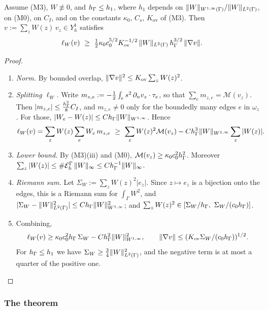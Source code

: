 \begin{lemma}\label{lb:assemble}
Assume (M3), $W\not\equiv0$, and $h_\Gamma\le h_1$, where $h_1$ depends on $\lVert W\rVert_{W^{1,\infty}(\Gamma)}/\lVert W\rVert_{L^2(\Gamma)}$, on (M0), on $C_I$, and on the constants $\kappa_0$, $C_s$, $K_{\mathrm{ov}}$ of (M3). Then $v:=\sum_zW(z)\,v_z\in Y_h^1$ satisfies
\[
\ell_W(v)\ \ge\ \tfrac12\kappa_0c_0^{5/2}K_{\mathrm{ov}}^{-1/2}\,\norm{W}_{L^2(\Gamma)}\,\hG^{3/2}\,\norm{\nabla v}.
\]
\end{lemma}

\begin{proof}
\begin{enumerate}
\item \emph{Norm.} By bounded overlap, $\lVert \nabla v\rVert^2\le K_{\mathrm{ov}}\sum_zW(z)^2$.
\item \emph{Splitting $\ell_W$.} Write $m_{z,e}:=-\frac12\int_es^2\,\partial_n v_z\cdot\tau_e$, so that $\sum_em_{z,e}=\mathcal M(v_z)$. Then $|m_{z,e}|\le\frac{h_\Gamma^2}{8}C_I$, and $m_{z,e}\ne0$ only for the boundedly many edges $e$ in $\omega_z$. For those, $|W_e-W(z)|\le Ch_\Gamma\lVert W\rVert_{W^{1,\infty}}$. Hence
\[
\ell_W(v)=\sum_zW(z)\sum_eW_e\,m_{z,e}\ \ge\ \sum_zW(z)^2\mathcal M(v_z)-C\hG^3\norm{W}_{W^{1,\infty}}\sum_z|W(z)| .
\]
\item \emph{Lower bound.} By (M3)(iii) and (M0), $\mathcal M(v_z)\ge\kappa_0c_0^2h_\Gamma^2$. Moreover $\sum_z|W(z)|\le\#\mathcal E_h^\Gamma\,\lVert W\rVert_\infty\le Ch_\Gamma^{-1}\lVert W\rVert_\infty$.
\item \emph{Riemann sum.} Let $\Sigma_W:=\sum_zW(z)^2|e_z|$. Since $z\mapsto e_z$ is a bijection onto the edges, this is a Riemann sum for $\int_\Gamma W^2$, and $|\Sigma_W-\lVert W\rVert^2_{L^2(\Gamma)}|\le Ch_\Gamma\lVert W\rVert^2_{W^{1,\infty}}$; and $\sum_zW(z)^2\in[\Sigma_W/\hG,\ \Sigma_W/(c_0\hG)]$.
\item Combining,
\[
\ell_W(v)\ge\kappa_0c_0^2h_\Gamma\,\Sigma_W-Ch_\Gamma^2\lVert W\rVert^2_{W^{1,\infty}},\qquad \lVert \nabla v\rVert\le(K_{\mathrm{ov}}\Sigma_W/(c_0h_\Gamma))^{1/2}.
\]
For $h_\Gamma\le h_1$ we have $\Sigma_W\ge\frac34\lVert W\rVert^2_{L^2(\Gamma)}$, and the negative term is at most a quarter of the positive one.\qedhere
\end{enumerate}
\end{proof}

\subsubsection{The theorem}

